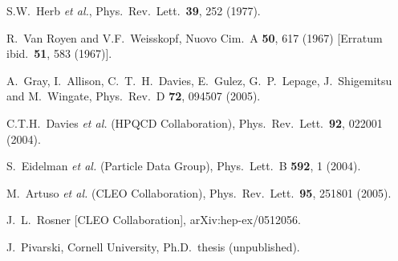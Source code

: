 \documentclass[
    ,final            %
  ]
  {aipproc}
\begin{document}



\begin{thebibliography}{9}
S.W.~Herb {\it et al.},
Phys.\ Rev.\ Lett.\  {\bf 39}, 252 (1977).

R.~Van Royen and V.F.~Weisskopf,
Nuovo Cim.\ A {\bf 50}, 617 (1967)
[Erratum ibid.\ {\bf 51}, 583 (1967)].

A.~Gray, I.~Allison, C.~T.~H.~Davies, E.~Gulez, G.~P.~Lepage, J.~Shigemitsu and M.~Wingate,
Phys.\ Rev.\ D {\bf 72}, 094507 (2005).

C.T.H.~Davies {\it et al.}  (HPQCD Collaboration),
Phys.\ Rev.\ Lett.\  {\bf 92}, 022001 (2004).

S.~Eidelman {\it et al.}  (Particle Data Group),
Phys.\ Lett.\ B {\bf 592}, 1 (2004).

M.~Artuso {\it et al.}  (CLEO Collaboration),
Phys.\ Rev.\ Lett.\ {\bf 95}, 251801 (2005).

J.~L.~Rosner  [CLEO Collaboration],
arXiv:hep-ex/0512056.

J.~Pivarski, Cornell University, Ph.D.~thesis (unpublished).

\end{thebibliography}
\end{document}
